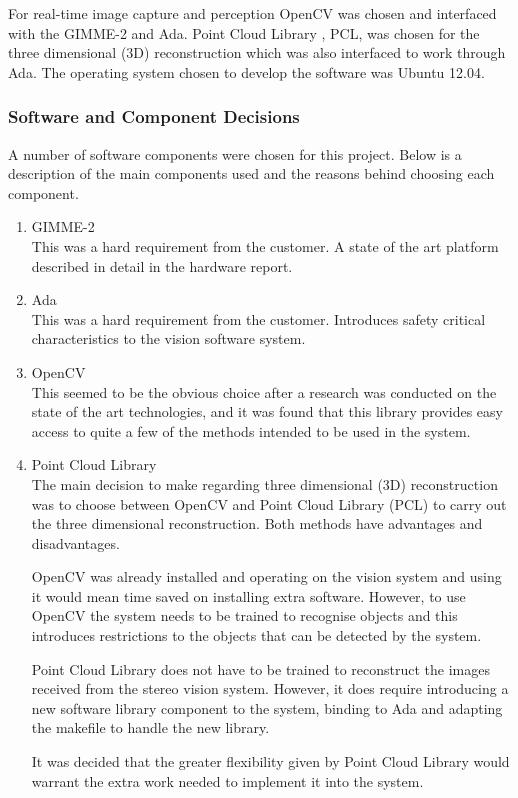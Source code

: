 For real-time image capture and perception OpenCV \cite{web:OpenCV} was chosen and interfaced with the GIMME-2 and Ada. Point Cloud Library \cite{web:PCL}, PCL, was chosen for the three dimensional (3D) reconstruction which was also interfaced to work through Ada. The operating system chosen to develop the software was Ubuntu 12.04.

\subsubsection{Software and Component Decisions}
A number of software components were chosen for this project. Below is a description of the main components used and the reasons behind choosing each component. 
\begin{enumerate}
  \item GIMME-2 \\ This was a hard requirement from the customer. A state of the art platform described in detail in the hardware report.
  \item Ada \\ This was a hard requirement from the customer. Introduces safety critical characteristics to the vision software system.
  \item OpenCV \\ This seemed to be the obvious choice after a research was conducted on the state of the art technologies, and it was found that this library provides easy access to quite a few of the methods intended to be used in the system.
  \item Point Cloud Library \\ The main decision to make regarding three dimensional (3D) reconstruction was to choose between OpenCV and Point Cloud Library (PCL) to carry out the three dimensional reconstruction. Both methods have advantages and disadvantages.

OpenCV was already installed and operating on the vision system and using it would mean time saved on installing extra software. However, to use OpenCV the system needs to be trained to recognise objects and this introduces restrictions to the objects that can be detected by the system.

Point Cloud Library does not have to be trained to reconstruct the images received from the stereo vision system. However, it does require introducing a new software library component to the system, binding to Ada and adapting the makefile to handle the new library.

It was decided that the greater flexibility given by Point Cloud Library would warrant the extra work needed to implement it into the system.
\end{enumerate}

